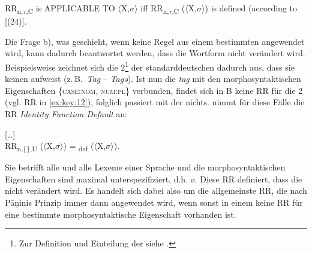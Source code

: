 \ea%
    \label{ex:key:25}
RR\textsubscript{n,}\textsubscript{$\tau $}\textsubscript{,C} is APPLICABLE TO $\langle$X,$\sigma$$\rangle$ iff RR\textsubscript{n,}\textsubscript{$\tau $}\textsubscript{,C} ($\langle$X,$\sigma$$\rangle$) is defined (according to [(24)]. \citep[52]{Stump2001}
\z

Die Frage b), was geschieht, wenn keine Regel aus einem bestimmten  angewendet wird, kann dadurch beantwortet werden, dass die Wortform nicht verändert wird. Beispielsweise zeichnet sich die  2\footnote{Zur Definition und Einteilung der  siehe .} der standarddeutschen  dadurch aus, dass sie keinen  aufweist (z.\,B.\ \textit{Tag} – \textit{Tagə}). Ist nun die  \textit{tag} mit den morphosyntaktischen Eigenschaften \{\textsc{case:nom}, \textsc{num:pl}\} verbunden, findet sich in  B keine RR für die  2 (vgl. RR in \ref{ex:key:12}), folglich passiert mit der  nichts. \citet{Stump2001} nimmt für diese Fälle die RR {\textit{Identity Function Default}} an:

\ea%
    \label{ex:key:26}
 […]\\
RR\textsubscript{n,\{\},U} ($\langle$X,$\sigma$$\rangle$) = \textsubscript{def} ($\langle$X,$\sigma$$\rangle$). \citep[53]{Stump2001}
\z

Sie betrifft alle  und alle Lexeme einer Sprache und die morphosyntaktischen Eigenschaften sind maximal unterspezifiziert, d.h. ø. Diese RR definiert, dass die  nicht verändert wird. Es handelt sich dabei also um die allgemeinste RR, die nach P\=aṇinis Prinzip immer dann angewendet wird, wenn sonst in einem  keine RR für eine bestimmte morphosyntaktische Eigenschaft vorhanden ist.

